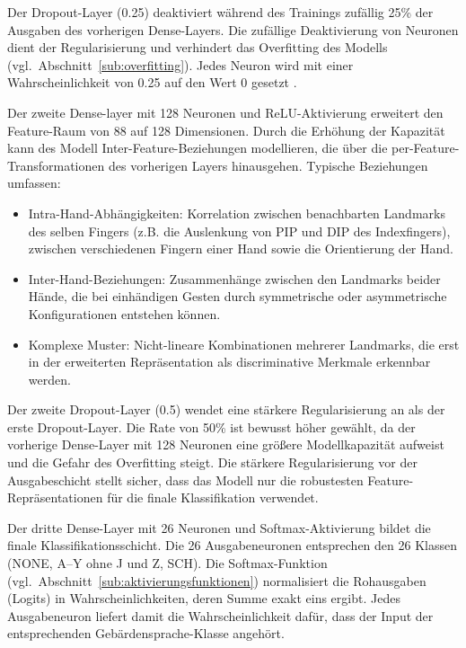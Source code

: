 Der Dropout-Layer (0.25) deaktiviert während des Trainings zufällig 25\% der Ausgaben des vorherigen Dense-Layers. Die zufällige Deaktivierung von Neuronen dient der Regularisierung und verhindert das Overfitting des Modells (vgl.\ Abschnitt~\ref{sub:overfitting}). Jedes Neuron wird mit einer Wahrscheinlichkeit von 0.25 auf den Wert 0 gesetzt \cite{yingOverviewOverfittingIts2019}.

Der zweite Dense-layer mit 128 Neuronen und ReLU-Aktivierung erweitert den Feature-Raum von 88 auf 128 Dimensionen. Durch die Erhöhung der Kapazität kann des Modell Inter-Feature-Beziehungen modellieren, die über die per-Feature-Transformationen des vorherigen Layers hinausgehen. Typische Beziehungen umfassen:

\begin{itemize}
    \item Intra-Hand-Abhängigkeiten: Korrelation zwischen benachbarten Landmarks des selben Fingers (z.B. die Auslenkung von PIP und DIP des Indexfingers), zwischen verschiedenen Fingern einer Hand sowie die Orientierung der Hand.
    \item Inter-Hand-Beziehungen: Zusammenhänge zwischen den Landmarks beider Hände, die bei einhändigen Gesten durch symmetrische oder asymmetrische Konfigurationen entstehen können.
    \item Komplexe Muster: Nicht-lineare Kombinationen mehrerer Landmarks, die erst in der erweiterten Repräsentation als discriminative Merkmale erkennbar werden.
\end{itemize}

Der zweite Dropout-Layer (0.5) wendet eine stärkere Regularisierung an als der erste \linebreak Dropout-Layer. Die Rate von 50\% ist bewusst höher gewählt, da der vorherige Dense-Layer mit 128 Neuronen eine größere Modellkapazität aufweist und die Gefahr des Overfitting steigt. Die stärkere Regularisierung vor der Ausgabeschicht stellt sicher, dass das Modell nur die robustesten Feature-Repräsentationen für die finale Klassifikation verwendet.

Der dritte Dense-Layer mit 26 Neuronen und Softmax-Aktivierung bildet die finale Klassifikationsschicht. Die 26 Ausgabeneuronen entsprechen den 26 Klassen (NONE, A–Y ohne J und Z, SCH). Die Softmax-Funktion (vgl.\ Abschnitt~\ref{sub:aktivierungsfunktionen}) normalisiert die Rohausgaben (Logits) in Wahrscheinlichkeiten, deren Summe exakt eins ergibt. Jedes Ausgabeneuron liefert damit die Wahrscheinlichkeit dafür, dass der Input der entsprechenden Gebärdensprache-Klasse angehört.

